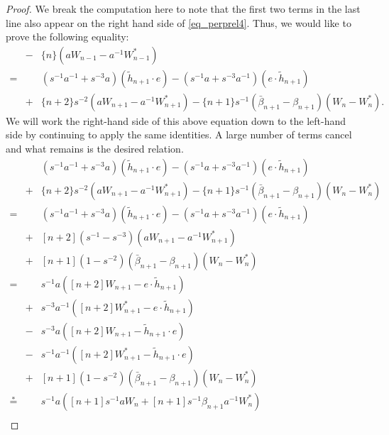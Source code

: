 \begin{proof}
We break the computation here to note that the first two terms in the last line also appear on the right hand side of \eqref{eq_perprel4}. Thus, we would like to prove the following equality:
\begin{eqnarray*}
&-&\{n\} \left( aW_{n-1} - a^{-1}W^*_{n-1} \right) \\
=&& \left( s^{-1}a^{-1} + s^{-3}a \right) \left( \tilde{h}_{n+1} \cdot e \right) - \left( s^{-1}a + s^{-3}a^{-1} \right) \left( e \cdot \tilde{h}_{n+1} \right) \\
&+&\{n+2\}s^{-2}\left( aW_{n+1} - a^{-1} W^*_{n+1} \right) - \{n+1\}s^{-1}\left( \bar{\beta}_{n+1} - \beta_{n+1} \right) \left( W_n - W^*_n \right).
\end{eqnarray*}
We will work the right-hand side of this above equation down to the left-hand side by continuing to apply the same identities. A large number of terms cancel and what remains is the desired relation.
\begin{eqnarray*}
&& \left( s^{-1}a^{-1} + s^{-3}a \right) \left( \tilde{h}_{n+1} \cdot e \right) - \left( s^{-1}a + s^{-3}a^{-1} \right) \left( e \cdot \tilde{h}_{n+1} \right) \\
&+& \{n+2\}s^{-2}\left( aW_{n+1} - a^{-1} W^*_{n+1} \right) - \{n+1\}s^{-1}\left( \bar{\beta}_{n+1} - \beta_{n+1} \right) \left( W_n - W^*_n \right) \\
=&& \left( s^{-1}a^{-1} + s^{-3}a \right) \left( \tilde{h}_{n+1} \cdot e \right) - \left( s^{-1}a+s^{-3}a^{-1} \right) \left( e \cdot \tilde{h}_{n+1} \right) \\
&+& [n+2]\left( s^{-1}-s^{-3} \right) \left(aW_{n+1} - a^{-1}W^*_{n+1} \right) \\
&+& [n+1]\left( 1-s^{-2} \right) \left( \bar{\beta}_{n+1}-\beta_{n+1} \right) \left(W_n - W^*_n \right) \\
=&& s^{-1}a\left( [n+2]W_{n+1} - e \cdot \tilde{h}_{n+1} \right) \\
&+& s^{-3}a^{-1}\left( [n+2]W^*_{n+1} - e \cdot \tilde{h}_{n+1} \right) \\
&-& s^{-3}a\left( [n+2]W_{n+1} - \tilde{h}_{n+1} \cdot e \right) \\
&-& s^{-1}a^{-1}\left( [n+2]W^*_{n+1} - \tilde{h}_{n+1} \cdot e \right) \\
&+& [n+1]\left( 1-s^{-2} \right) \left( \bar{\beta}_{n+1} -\beta_{n+1} \right) \left( W_n - W^*_n \right) \\
\overset{\ast}{=}&& s^{-1}a\left( [n+1]s^{-1}aW_n + [n+1]s^{-1}\beta_{n+1}a^{-1}W^*_n \right) \\

\end{eqnarray*}
\end{proof}

